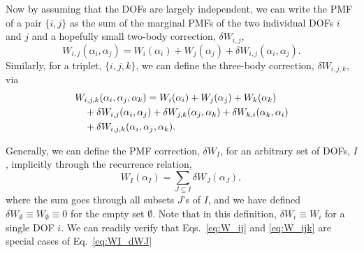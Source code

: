 \documentclass[reprint, superscriptaddress]{revtex4-1}
\begin{document}
Now by assuming that the DOFs are largely independent,
we can write the PMF of a pair $\{i, j\}$
as the sum of the marginal PMFs of the two individual DOFs $i$ and $j$
and a hopefully small two-body correction, $\delta W_{i,j}$,
%
\begin{equation}
  W_{i,j}(\alpha_i, \alpha_j)
  =
  W_i(\alpha_i) + W_j(\alpha_j)
  + \delta W_{i,j}(\alpha_i, \alpha_j)
  .
  \label{eq:W_ij}
\end{equation}
%
Similarly, for a triplet, $\{i, j, k\}$,
we can define the three-body correction, $\delta W_{i,j,k}$, via
%
\begin{align}
  &W_{i,j,k}(\alpha_i, \alpha_j, \alpha_k)
  =
  W_i(\alpha_i) + W_j(\alpha_j) + W_k(\alpha_k)
  \notag \\
  &\quad
  + \delta W_{i,j}(\alpha_i, \alpha_j)
  + \delta W_{j,k}(\alpha_j, \alpha_k)
  + \delta W_{k,i}(\alpha_k, \alpha_i)
  \notag \\
  &\quad
  + \delta W_{i,j,k}(\alpha_i, \alpha_j, \alpha_k)
  .
  \label{eq:W_ijk}
\end{align}
%


Generally, we can define the PMF correction, $\delta W_I$,
for an arbitrary set of DOFs, $I$,
implicitly through the recurrence relation,
%
\begin{equation}
  W_I(\alpha_I)
  =
  \sum_{J \subseteq I}
  \delta W_J(\alpha_J)
  ,
  \label{eq:WI_dWJ}
\end{equation}
%
where the sum goes through all subsets $J$'s of $I$,
and we have defined
$\delta W_\emptyset \equiv W_\emptyset \equiv 0$
for the empty set $\emptyset$.
%
Note that in this definition,
$\delta W_i \equiv W_i$
for a single DOF $i$.
%
We can readily verify that
Eqs.~\eqref{eq:W_ij} and \eqref{eq:W_ijk}
are special cases of Eq.~\eqref{eq:WI_dWJ}
\end{document}
